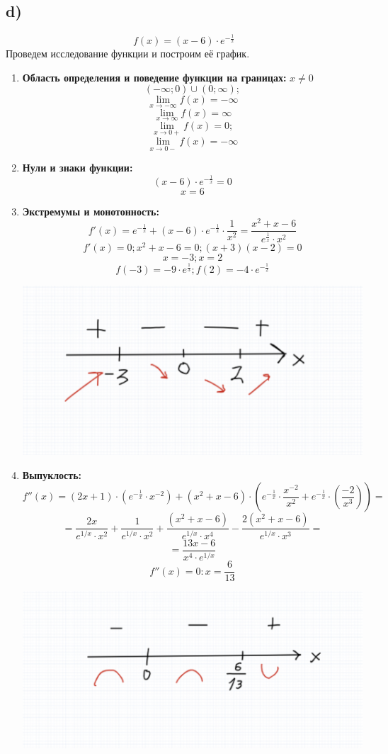 \documentclass[a4paper,12pt]{article}
\begin{document}
\subsection*{d)}
\[
f(x) = (x - 6) \cdot e^{-\frac{1}{x}}
\]
Проведем исследование функции и построим её график.
\begin{enumerate}
\item \textbf{Область определения и поведение функции на границах:}
 $ x \neq 0$
\[
(-\infty; 0) \cup (0; \infty);
\]
\[
\lim_{x \rightarrow -\infty} f(x) = -\infty
\]
\[
\lim_{x \rightarrow \infty} f(x) = \infty
\]
\[
\lim_{x \rightarrow 0+} f(x)= 0;
\]
\[
\lim_{x \rightarrow 0-} f(x) = -\infty
\]
\item \textbf{Нули и знаки функции:}
\[(x - 6) \cdot e^{-\frac{1}{x}} = 0
\]
\[
x = 6
\]
\item \textbf{Экстремумы и монотонность:}
\[
f'(x) = e^{-\frac{1}{x}} + (x-6) \cdot e^{-\frac{1}{x}} \cdot \frac{1}{x^2} = \frac{x^2 + x- 6}{e^{\frac{1}{x}} \cdot x^2}
\]
\[
f'(x) = 0; x^2 + x - 6 = 0; (x+3)(x-2) = 0
\]
\[
x = -3; x = 2
\]
\[
f(-3) = -9 \cdot e ^{\frac{1}{3}}; f(2) = -4 \cdot e^{-\frac{1}{2}}
\]
\begin{center}
\includegraphics[scale=0.3]{7.png}
\end{center} 
\item \textbf{Выпуклость:}
\[
f''(x) = (2x+1) \cdot (e^{-\frac{1}{x}} \cdot x^{-2}) + \left(x^2 + x - 6\right) \cdot \left(e^{-\frac{1}{x}} \cdot \frac{x^{-2}}{x^2}  + e^{-\frac{1}{x}} \cdot \left(\frac{-2}{x^3}\right) \right) = 
\]
\[
=\frac{2x}{e^{1/x} \cdot x^2} + \frac{1}{e^{1/x} \cdot x^2} +  \frac{(x^2+x-6)}{e^{1/x} \cdot x^4} - \frac{2(x^2+x-6)}{e^{1/x} \cdot x^3} = 
\]
\[
= \frac{13x - 6}{x^4 \cdot e^{1/x}}
\]
\[
f''(x) = 0 : x = \frac{6}{13}
\]
\begin{center}
\includegraphics[scale=0.4]{8.png}

\end{center}
\end{enumerate}
\end{document}
